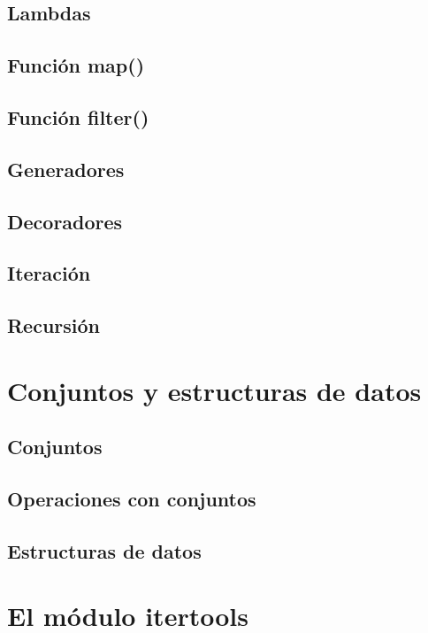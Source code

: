 \documentclass{article}
\begin{document}
\subsection{Lambdas}

\subsection{Función map()}

\subsection{Función filter()}

\subsection{Generadores}

\subsection{Decoradores}

\subsection{Iteración}

\subsection{Recursión}

\section{Conjuntos y estructuras de datos}

\subsection{Conjuntos}

\subsection{Operaciones con conjuntos}

\subsection{Estructuras de datos}

\section{El módulo itertools}
\end{document}
